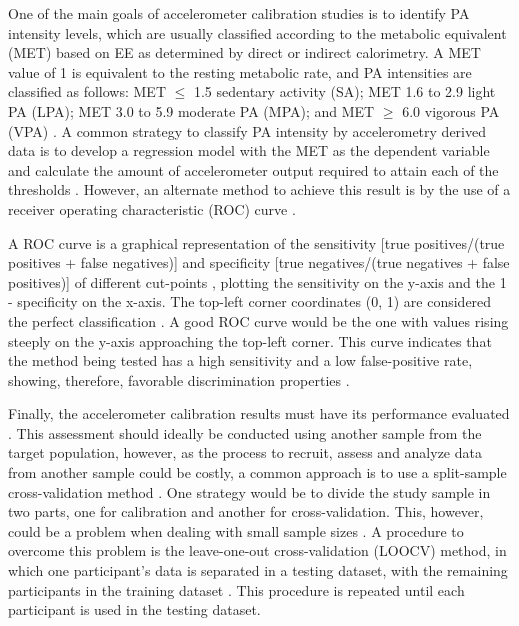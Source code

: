 \documentclass[12pt]{article}
\begin{document}
One of the main goals of accelerometer calibration studies is to identify PA intensity levels, which are usually classified according to the metabolic equivalent (MET) based on EE as determined by direct or indirect calorimetry. A MET value of 1 is equivalent to the resting metabolic rate, and PA intensities are classified as follows: MET $\leq$ 1.5 {\textemdash} sedentary activity (SA); MET 1.6 to 2.9 {\textemdash} light PA (LPA); MET 3.0 to 5.9 {\textemdash} moderate PA (MPA); and MET $\geq$ 6.0 {\textemdash} vigorous PA (VPA) . A common strategy to classify PA intensity by accelerometry derived data is to develop a regression model with the MET as the dependent variable and calculate the amount of accelerometer output required to attain each of the thresholds . However, an alternate method to achieve this result is by the use of a receiver operating characteristic (ROC) curve .

A ROC curve is a graphical representation of the sensitivity [true positives/(true positives + false negatives)] and specificity [true negatives/(true negatives + false positives)] of different cut-points , plotting the sensitivity on the y-axis and the 1 - specificity on the x-axis. The top-left corner coordinates (0, 1) are considered the perfect classification . A good ROC curve would be the one with values rising steeply on the y-axis approaching the top-left corner. This curve indicates that the method being tested has a high sensitivity and a low false-positive rate, showing, therefore, favorable discrimination properties .

Finally, the accelerometer calibration results must have its performance evaluated . This assessment should ideally be conducted using another sample from the target population, however, as the process to recruit, assess and analyze data from another sample could be costly, a common approach is to use a split-sample cross-validation method . One strategy would be to divide the study sample in two parts, one for calibration and another for cross-validation. This, however, could be a problem when dealing with small sample sizes . A procedure to overcome this problem is the leave-one-out cross-validation (LOOCV) method, in which one participant's data is separated in a testing dataset, with the remaining participants in the training dataset . This procedure is repeated until each participant is used in the testing dataset.
\end{document}
